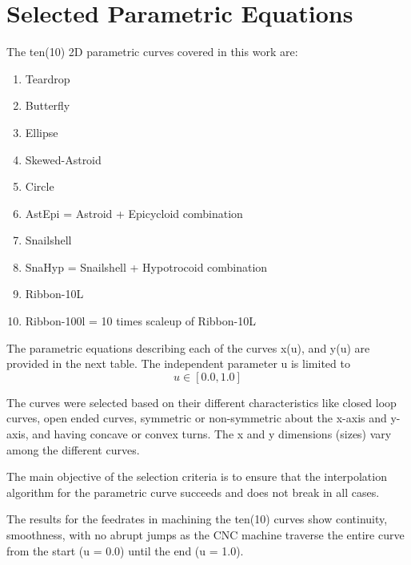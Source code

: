 
	
\section{Selected Parametric Equations}


The ten(10) 2D parametric curves covered in this work are:
\begin{enumerate}
	\item Teardrop
	\item Butterfly
	\item Ellipse
	\item Skewed-Astroid
	\item Circle
	\item AstEpi = Astroid + Epicycloid combination
	\item Snailshell
	\item SnaHyp = Snailshell + Hypotrocoid combination
	\item Ribbon-10L
	\item Ribbon-100l = 10 times scaleup of Ribbon-10L
	
\end{enumerate}

The parametric equations describing each of the curves x(u), and y(u) are provided in the next table. The independent parameter u is limited to
\begin{equation}
u  \in  [0.0, 1.0] \nonumber
\end{equation}

The curves were selected based on their different characteristics like closed loop curves, open ended curves, symmetric or non-symmetric about the x-axis and y-axis, and having concave or convex turns. The x and y dimensions (sizes) vary among the different curves. \vspace*{1\baselineskip}

The main objective of the selection criteria is to ensure that the interpolation algorithm for the parametric curve succeeds and does not break in all cases. \vspace*{1\baselineskip}
	
The results for the feedrates in machining the ten(10) curves show continuity, smoothness, with no abrupt jumps as the CNC machine traverse the entire curve from the start (u = 0.0) until the end (u = 1.0).	\vspace*{1\baselineskip}

